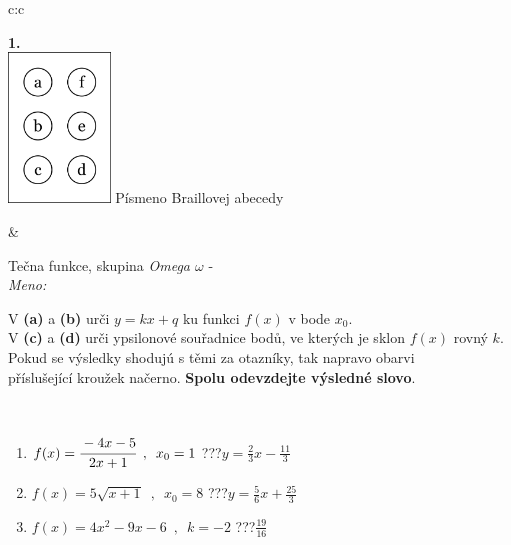 \documentclass[10pt]{report}
\begin{document}
\begin{tabular}{c:c}
\begin{minipage}[c][104.5mm][t]{0.5\linewidth}
\begin{center}
\begin{minipage}{0.20\linewidth}
\begin{center}
{\Huge\bfseries 1.} \\[2mm]
\includegraphics[height=40mm]{../images/braille.png}
{\small Písmeno Braillovej abecedy}
\end{center}
\end{minipage}
\end{center}
\end{minipage}
&
\begin{minipage}[c][104.5mm][t]{0.5\linewidth}
\begin{center}
\vspace{7mm}
{\huge Tečna funkce, skupina \textit{Omega $\omega$} -}\\[5mm]
\textit{Meno:}\phantom{xxxxxxxxxxxxxxxxxxxxxxxxxxxxxxxxxxxxxxxxxxxxxxxxxxxxxxxxxxxxxxxxx}\\[5mm]
\begin{minipage}{0.95\linewidth}
\begin{center}
V \textbf{(a)} a \textbf{(b)} urči  $y = kx + q$ ku funkci $f(x)$ v bode $x_0$.\\V \textbf{(c)} a \textbf{(d)} urči ypsilonové souřadnice bodů, ve kterých je sklon $f(x)$ rovný $k$.\\Pokud se výsledky shodujú s těmi za otazníky, tak napravo obarvi\\příslušející kroužek načerno. \textbf{Spolu odevzdejte výsledné slovo}.
\end{center}
\end{minipage}
\\[1mm]
\begin{minipage}{0.79\linewidth}
\begin{center}
\begin{varwidth}{\linewidth}
\begin{enumerate}
\small
\item $f(x)=\cfrac{-4x-5}{2x+1}\enspace , \enspace x_0=1$\quad \dotfill\; ???\;\dotfill \quad $y = \frac{2}{3}x-\frac{11}{3}$
\item $f(x)=5\sqrt{x+1}\enspace , \enspace x_0=8$\quad \dotfill\; ???\;\dotfill \quad $y = \frac{5}{6}x+\frac{25}{3}$
\item $f(x)=4x^2-9x-6\enspace , \enspace k=-2$\quad \dotfill\; ???\;\dotfill \quad $\frac{19}{16}$

\end{enumerate}
\end{varwidth}
\end{center}
\end{minipage}
\end{center}
\end{minipage}
\end{tabular}
\end{document}

